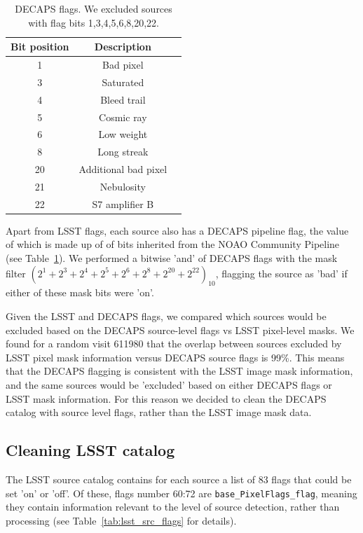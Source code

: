 \documentclass[DM,lsstdraft,toc,usenatbib]{lsstdoc}
\begin{document}
\begin{table}
\centering
\caption{DECAPS flags. We excluded sources with flag bits 1,3,4,5,6,8,20,22.}
\label{tab:decaps_flags}
\begin{tabular}{ ccc} 
\hline
Bit position & Description \\ 
\hline
1  &     Bad pixel            \\ 
3  &    Saturated      \\ 
4  &    Bleed trail      \\ 
5  &    Cosmic ray       \\ 
6  &    Low weight      \\ 
8  &    Long streak      \\ 
20  &   Additional bad pixel    \\ 
21 &    Nebulosity     \\ 
22  &   S7 amplifier B        \\ 
\hline
\end{tabular}
\end{table}

Apart from LSST flags, each source also has a DECAPS pipeline flag, the value of which is made up of of bits inherited from the NOAO Community Pipeline (see Table~\ref{tab:decaps_flags}). We performed a bitwise 'and' of DECAPS flags with the mask filter $(2^{1}+ 2^{3}+  2^{4}+  2^{5}+  2^{6}+  2^{8}+  2^{20}+  2^{22})_{10}$, flagging the source as 'bad' if either of these mask bits were 'on'. 

Given the LSST and DECAPS flags, we compared which sources would be excluded based on the DECAPS source-level flags vs LSST pixel-level masks. We found for a random visit  611980  that the overlap between sources excluded by LSST pixel mask information versus DECAPS source flags is 99\%.  This means that the DECAPS flagging is consistent with the LSST image mask information, and the same sources would be 'excluded' based on either DECAPS flags or LSST mask information. For this reason we decided to clean the DECAPS catalog with  source level flags, rather than the LSST image mask data. 
 
\subsection{Cleaning LSST catalog}
\label{sec:clean_lsst}
The LSST source catalog contains for each source a list of 83 flags that could be set 'on' or 'off'. Of these, flags number 60:72 are \verb|base_PixelFlags_flag|, meaning they contain information relevant to the level of source detection, rather than processing (see Table~\ref{tab:lsst_src_flags} for details).
\end{document}
